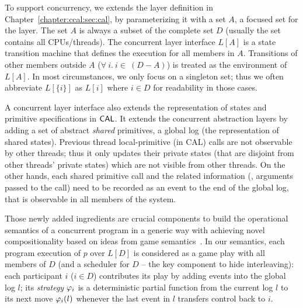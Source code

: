 To support concurrency, 
we extends the layer definition in Chapter~\ref{chapter:ccal:sec:cal},
by parameterizing it with a set $A$, 
a focused set for the layer.
The set $A$ is always a subset of the complete set $D$ (usually the set contains all CPUs/threads). 
The concurrent layer interface $L[A]$ is a state transition machine
that defines the execution for all members in $A$. 
Transitions of other members outside $A$  ($\forall \ i . \ i \in\ (D - A)$)
is treated as the environment of $L[A]$. 
In most circumstances, we only focus on a singleton set; thus we often abbreviate $L[\{i\}]$ as $L[i]$ where $i\in{}D$ for readability in those cases.

A concurrent layer interface also extends the representation of states and primitive specifications in $\mathsf{CAL}$.
It extends the concurrent abstraction layers by adding a set of abstract \textit{shared} primitives, a global log (the representation of shared states).
Previous thread local-primitive (in CAL) calls are not observable by other threads;
thus it only updates their private states (that are disjoint from other threads' private states) which are not visible from other threads. 
On the other hands, each shared primitive call and the related information (\ie, arguments passed to the call) 
need to be recorded as an event to the end of the global log, that is observable in all members of the system. 



Those newly added ingredients are crucial 
components to build the operational semantics of a concurrent program  
in a generic way
with achieving novel compositionality based on
ideas from game semantics~\cite{gsinvite}. 
In our semantics, 
each program execution of $p$ over 
$L[D]$ is considered as a game play with all members of $D$ (and a scheduler for $D$ -- the key component to hide interleaving):
each participant $i$ ($i\in{}D$) contributes its
play by adding events into the global log $l$; its {\em strategy}
$\varphi_{i}$ is a deterministic partial function from
the current log $l$ to its next move $\varphi_{i}(l)$ whenever
the last event in $l$ transfers control back to $i$. 

